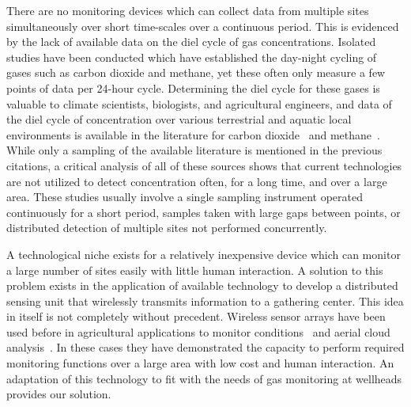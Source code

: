\documentclass[numbook, envcountsect, envcountsame, envcountreset, runningheads, twocolumn]{svjour3}
\begin{document}
			There are no monitoring devices which can collect data from multiple sites simultaneously over short time-scales over a continuous period.  This is evidenced by the lack of available data on the diel cycle of gas concentrations.  Isolated studies have been conducted which have established the day-night cycling of gases such as carbon dioxide and methane, yet these often only measure a few points of data per 24-hour cycle.  Determining the diel cycle for these gases is valuable to climate scientists, biologists, and agricultural engineers, and data of the diel cycle of concentration over various terrestrial and aquatic local environments is available in the literature for carbon dioxide~\cite{raymond_carbon_1997,goulden_diel_2004,raich_comparison_1990,osozawa_diel_1995,ni_sestructures_2000,maberly_diel_1996} and methane~\cite{ding_diel_2004,kaki_diel_2001,zhang_diel_2011,wang_effect_1997,wang_factors_1999,van_der_nat_diel_1998}.  While only a sampling of the available literature is mentioned in the previous citations, a critical analysis of all of these sources shows that current technologies are not utilized to detect concentration often, for a long time, and over a large area.  These studies usually involve a single sampling instrument operated continuously for a short period, samples taken with large gaps between points, or distributed detection of multiple sites not performed concurrently.  
			
			
			A technological niche exists for a relatively inexpensive device which can monitor a large number of sites easily with little human interaction.  A solution to this problem exists in the application of available technology to develop a distributed sensing unit that wirelessly transmits information to a gathering center.  This idea in itself is not completely without precedent.  Wireless sensor arrays have been used before in agricultural applications to monitor conditions~\cite{garcia-sanchez_wireless_2011} and aerial cloud analysis~\cite{allred_sensorflock:_2007}.  In these cases they have demonstrated the capacity to perform required monitoring functions over a large area with low cost and human interaction.  An adaptation of this technology to fit with the needs of gas monitoring at wellheads provides our solution.
			
\end{document}
